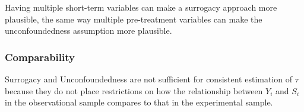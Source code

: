 \begin{note}
    Having multiple short-term variables can make a surrogacy approach more plausible, the same way multiple pre-treatment variables can make the unconfoundedness assumption more plausible.
\end{note}


\subsubsection*{Comparability}
Surrogacy and Unconfoundedness are not sufficient for consistent estimation of $\tau$ because they do not place restrictions on how the relationship between $Y_i$ and $S_i$ in the observational sample compares to that in the experimental sample.